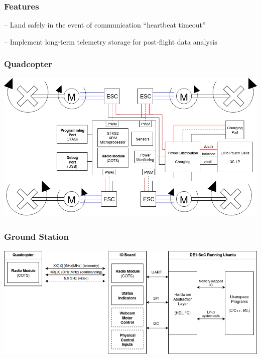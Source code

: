 \documentclass{beamer}
\begin{document}
\begin{frame}
\frametitle{Features}
\begin{description}[align=right,labelwidth=100pt,itemsep=10pt]
	\item [Single-Fault Tolerant] -- Land safely in the event of communication
		``heartbeat timeout''
	\item [Telemetry Archival] -- Implement long-term telemetry storage for
		post-flight data analysis
\end{description}
\end{frame}

\begin{frame}
\frametitle{Quadcopter}
\begin{center}
\includegraphics[width=\linewidth]{../src/im/quadcopter}
\end{center}
\end{frame}

\begin{frame}
\frametitle{Ground Station}
\begin{center}
\includegraphics[width=\linewidth]{../src/im/ground_station}
\end{center}
\end{frame}
\end{document}
